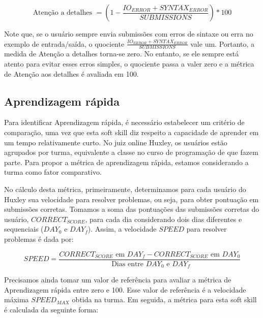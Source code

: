 \begin{equation} \label{m:atencao}
\mbox{Atenção a detalhes } = \left(1 - \frac {IO_{ERROR} + SYNTAX_{ERROR}}{SUBMISSIONS}\right) * 100
\end{equation}

Note que, se o usuário sempre envia submissões com erros de sintaxe ou erra no exemplo de entrada/saída, o quociente 
$\frac {IO_{ERROR} + SYNTAX_{ERROR}}{SUBMISSIONS}$ vale um. Portanto, a medida de Atenção a detalhes torna-se zero.
No entanto, se ele sempre está atento para evitar esses erros simples, o quociente passa a valer zero e a métrica de Atenção aos detalhes é avaliada em 100.

\subsection{Aprendizagem rápida}

Para identificar Aprendizagem rápida, é necessário estabelecer um critério de comparação, uma vez que esta soft skill diz respeito a capacidade de aprender em um tempo relativamente curto. No juiz online Huxley, os usuários estão agrupados por turma, equivalente a classe no curso de programação de que fazem parte. Para propor a métrica de aprendizagem rápida, estamos considerando a turma como fator comparativo.

No cálculo desta métrica, primeiramente, determinamos para cada usuário do Huxley sua velocidade para resolver problemas, ou seja, para obter pontuação em submissões corretas. Tomamos a soma das pontuações das submissões corretas do usuário, $CORRECT_{SCORE}$, para cada dia considerando dois dias diferentes e sequenciais ($DAY_0$ e $DAY_f$). Assim, a velocidade $SPEED$ para resolver problemas é dada por:

\begin{equation} \label{m:velocidade}
SPEED = \frac {CORRECT_{SCORE} \mbox{ em } DAY_f - CORRECT_{SCORE} \mbox{ em } DAY_0 }
              { \mbox{ Dias entre } DAY_0 \mbox{ e } DAY_f }
\end{equation}


Precisamos ainda tomar um valor de referência para avaliar a métrica de Aprendizagem rápida entre zero e 100. Esse valor de referência é a velocidade máxima $SPEED_{MAX}$ obtida na turma. Em seguida, a métrica para esta soft skill é calculada da seguinte forma:

